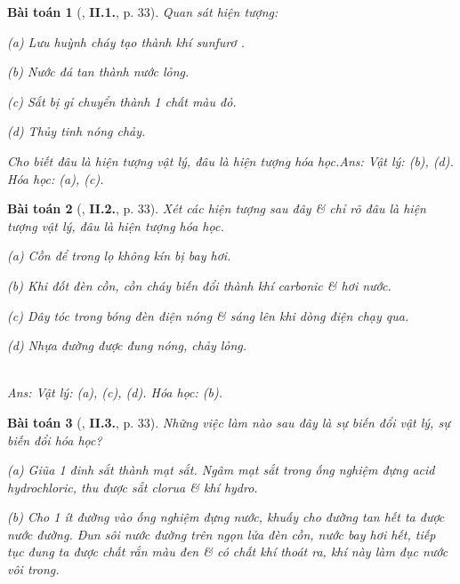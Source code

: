 \documentclass{article}
\numberwithin{equation}{section}
\newtheorem{baitoan}{Bài toán}
\begin{document}
\begin{baitoan}[\cite{Truong_BTNC_Hoa_Hoc_8_2022}, \textbf{II.1.}, p. 33]
	Quan sát hiện tượng:
	\begin{enumerate*}
		\item[(a)] Lưu huỳnh cháy tạo thành khí sunfurơ \emph{}.
		\item[(b)] Nước đá tan thành nước lỏng.
		\item[(c)] Sắt bị gỉ chuyển thành 1 chất màu đỏ.
		\item[(d)] Thủy tinh nóng chảy.
	\end{enumerate*}
	Cho biết đâu là hiện tượng vật lý, đâu là hiện tượng hóa học.\hfill\textsf{Ans:} Vật lý: (b), (d). Hóa học: (a), (c).
\end{baitoan}

\begin{baitoan}[\cite{Truong_BTNC_Hoa_Hoc_8_2022}, \textbf{II.2.}, p. 33]
	Xét các hiện tượng sau đây \& chỉ rõ đâu là hiện tượng vật lý, đâu là hiện tượng hóa học.
	\begin{enumerate*}
		\item[(a)] Cồn để trong lọ không kín bị bay hơi.
		\item[(b)] Khi đốt đèn cồn, cồn cháy biến đổi thành khí carbonic \& hơi nước.
		\item[(c)] Dây tóc trong bóng đèn điện nóng \& sáng lên khi dòng điện chạy qua.
		\item[(d)] Nhựa đường được đung nóng, chảy lỏng.
	\end{enumerate*}\\\mbox{}\hfill\textsf{Ans:} Vật lý: (a), (c), (d). Hóa học: (b).
\end{baitoan}

\begin{baitoan}[\cite{Truong_BTNC_Hoa_Hoc_8_2022}, \textbf{II.3.}, p. 33]
	Những việc làm nào sau đây là sự biến đổi vật lý, sự biến đổi hóa học?
	\begin{enumerate*}
		\item[(a)] Giũa 1 đinh sắt thành mạt sắt. Ngâm mạt sắt trong ống nghiệm đựng acid hydrochloric, thu được sắt clorua \& khí hydro.
		\item[(b)] Cho 1 ít đường vào ống nghiệm đựng nước, khuấy cho đường tan hết ta được nước đường. Đun sôi nước đường trên ngọn lửa đèn cồn, nước bay hơi hết, tiếp tục đung ta được chất rắn màu đen \& có chất khí thoát ra, khí này làm đục nước vôi trong.
	\end{enumerate*}
\end{baitoan}
\end{document}
